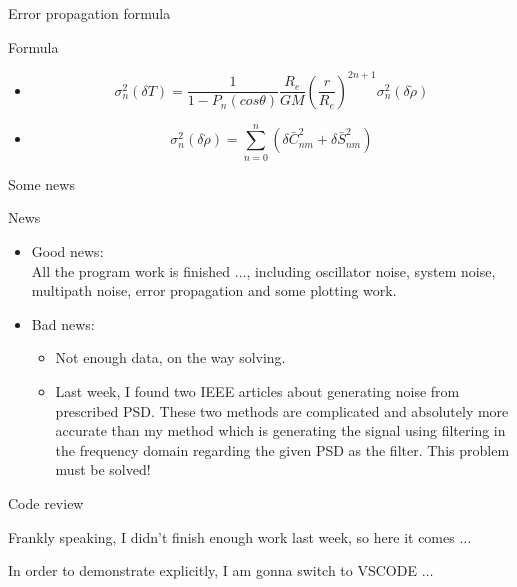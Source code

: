\documentclass{beamer}
\begin{document}
\begin{frame}{Error propagation formula}
\begin{block}{Formula}
    \begin{itemize}
        \item \begin{equation}
        \sigma _{n}^{2}\left( \delta T \right) =\frac{1}{1-P_n\left( cos\theta \right)}\frac{R_e}{GM}\left( \frac{r}{R_e} \right) ^{2n+1}\sigma _{n}^{2}\left( \delta \dot{\rho} \right) 
        \end{equation}
        \item \begin{equation}
            \sigma _{n}^{2}\left( \delta \dot{\rho} \right) =\sum_{n=0}^n{\left( \delta \bar{C}_{nm}^{2}+\delta \bar{S}_{nm}^{2} \right)}
        \end{equation}
    \end{itemize}
    
\end{block}

\end{frame}

\begin{frame}[fragile]{Some news}
    \begin{block}{News}
        \begin{itemize}
            \item \alert{Good news:} \\
            All the program work is finished $\dots$, including oscillator noise, system noise, multipath noise, error propagation and some plotting work.
            \item \alert{Bad news:} \begin{itemize}
                \item Not enough data, on the way solving.
                \item Last week, I found two IEEE articles about generating noise from prescribed PSD. These two methods are complicated and absolutely more accurate than my method which is generating the signal using filtering in the frequency domain regarding the given PSD as the filter. \alert{This problem must be solved!}
            \end{itemize}
        \end{itemize}
    \end{block}
    
\end{frame}


\begin{frame}[fragile]{Code review}
    
    Frankly speaking, I didn't finish enough work last week, so here it comes $\dots$
    
    \vfill
    
    In order to demonstrate explicitly, I am gonna switch to VSCODE $\dots$
\end{frame}
\end{document}
